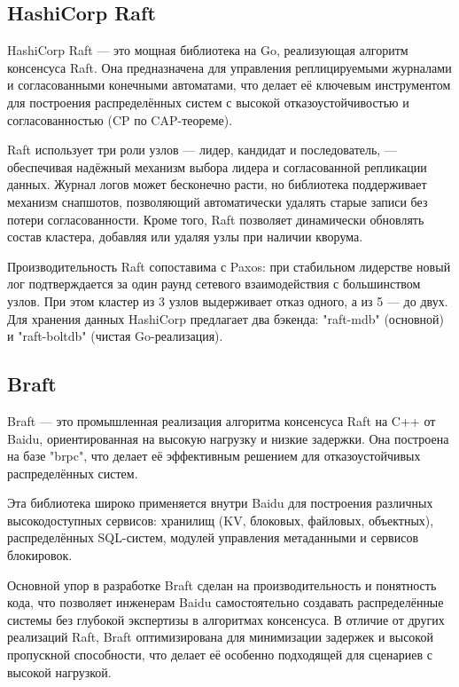 \subsection{HashiCorp Raft}

HashiCorp Raft — это мощная библиотека на Go, реализующая алгоритм консенсуса Raft. Она
предназначена для управления реплицируемыми журналами и согласованными конечными
автоматами, что делает её ключевым инструментом для построения распределённых систем с
высокой отказоустойчивостью и согласованностью (CP по CAP-теореме).

Raft использует три роли узлов — лидер, кандидат и последователь, — обеспечивая надёжный
механизм выбора лидера и согласованной репликации данных. Журнал логов может бесконечно
расти, но библиотека поддерживает механизм снапшотов, позволяющий автоматически удалять
старые записи без потери согласованности. Кроме того, Raft позволяет динамически
обновлять состав кластера, добавляя или удаляя узлы при наличии кворума.

Производительность Raft сопоставима с Paxos: при стабильном лидерстве новый лог
подтверждается за один раунд сетевого взаимодействия с большинством узлов. При этом
кластер из 3 узлов выдерживает отказ одного, а из 5 — до двух. Для хранения данных
HashiCorp предлагает два бэкенда: "raft-mdb" (основной) и "raft-boltdb" (чистая
Go-реализация).

\subsection{Braft}

Braft — это промышленная реализация алгоритма консенсуса Raft на C++ от Baidu,
ориентированная на высокую нагрузку и низкие задержки. Она построена на базе "brpc",
что делает её эффективным решением для отказоустойчивых распределённых систем.  

Эта библиотека широко применяется внутри Baidu для построения различных высокодоступных
сервисов: хранилищ (KV, блоковых, файловых, объектных), распределённых SQL-систем,
модулей управления метаданными и сервисов блокировок.  

Основной упор в разработке Braft сделан на производительность и понятность кода, что
позволяет инженерам Baidu самостоятельно создавать распределённые системы без глубокой
экспертизы в алгоритмах консенсуса. В отличие от других реализаций Raft, Braft
оптимизирована для минимизации задержек и высокой пропускной способности, что делает
её особенно подходящей для сценариев с высокой нагрузкой.  

